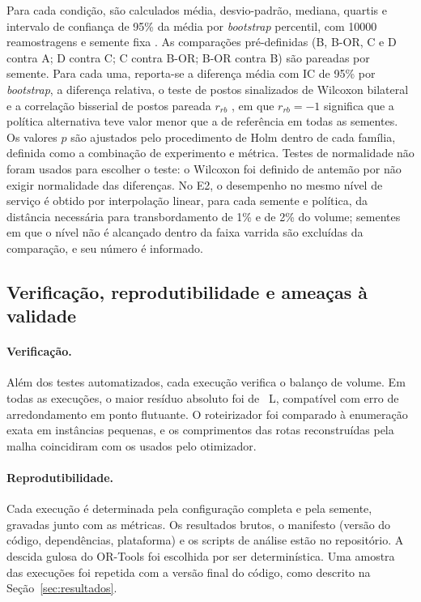 Para cada condição, são calculados média, desvio-padrão, mediana, quartis e
intervalo de confiança de 95\% da média por \emph{bootstrap} percentil, com
\num{10000} reamostragens e semente fixa
\cite{efron1979bootstrap,efron1993introduction}. As comparações pré-definidas
(B, B-OR, C e D contra A; D contra C; C contra B-OR; B-OR contra B) são
pareadas por semente. Para cada uma, reporta-se a diferença média com IC de
95\% por \emph{bootstrap}, a diferença relativa, o teste de postos sinalizados
de Wilcoxon bilateral \cite{wilcoxon1945individual} e a correlação bisserial
de postos pareada $r_{rb}$ \cite{kerby2014simple}, em que $r_{rb} = -1$
significa que a política alternativa teve valor menor que a de referência em
todas as sementes. Os valores $p$ são ajustados pelo procedimento de Holm
\cite{holm1979simple} dentro de cada família, definida como a combinação de
experimento e métrica. Testes de normalidade não foram usados para escolher o
teste: o Wilcoxon foi definido de antemão por não exigir normalidade das
diferenças. No E2, o desempenho no mesmo nível de serviço é obtido por
interpolação linear, para cada semente e política, da distância necessária
para transbordamento de 1\% e de 2\% do volume; sementes em que o nível não é
alcançado dentro da faixa varrida são excluídas da comparação, e seu número é
informado.

\subsection{Verificação, reprodutibilidade e ameaças à validade}

\paragraph{Verificação.}
Além dos testes automatizados, cada execução verifica o balanço de volume. Em
todas as \NExecTotal{} execuções, o maior resíduo absoluto foi de
\BalancoMaxResidual{}~L, compatível com erro de arredondamento em ponto
flutuante. O roteirizador foi comparado à enumeração exata em instâncias
pequenas, e os comprimentos das rotas reconstruídas pela malha coincidiram com
os usados pelo otimizador.

\paragraph{Reprodutibilidade.}
Cada execução é determinada pela configuração completa e pela semente,
gravadas junto com as métricas. Os resultados brutos, o manifesto (versão do
código, dependências, plataforma) e os scripts de análise estão no
repositório. A descida gulosa do OR-Tools foi escolhida por ser determinística.
Uma amostra das execuções foi repetida com a versão final do código, como
descrito na Seção~\ref{sec:resultados}.

